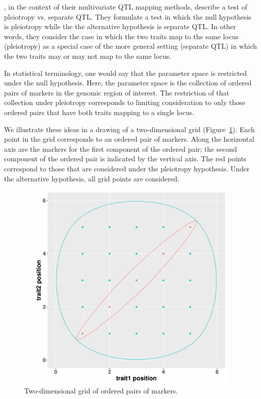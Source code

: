 \documentclass[]{article}\usepackage[]{graphicx}\usepackage[]{color}
\newenvironment{knitrout}{}{} %
\begin{document}
\citet{jiang1995multiple}, in the context of their multivariate QTL mapping methods, 
describe a test of pleiotropy vs. separate QTL. 
They formulate a test in which the null hypothesis
is pleiotropy while the the alternative hypothesis is separate QTL.
In other words, they consider the case in which the two traits map to the same locus
(pleiotropy) as a special case of the more general setting (separate QTL)
in which the two traits may or may not map to the same locus.

In statistical terminology, one would say that the parameter space is restricted under the null hypothesis. Here, the parameter space is the collection of ordered pairs of markers in the genomic region of interest. The restriction of that collection under pleiotropy corresponds to limiting consideration to only those ordered pairs that have both traits mapping to a single locus. 

We illustrate these ideas in a drawing of a two-dimensional grid (Figure~\ref{fig:encircle}). Each point in the grid corresponds to an ordered pair of markers. Along the horizontal axis are the markers for the first component of the ordered pair; the second component of the ordered pair is indicated by the vertical axis. The red points correspond to those that are considered under the pleiotropy hypothesis. Under the alternative hypothesis, all grid points are considered. 




\begin{knitrout}
\color{fgcolor}\begin{figure}
\includegraphics[width=6in,height=4in]{figure/encircle-1} \caption[Two-dimensional grid of ordered pairs of markers]{Two-dimensional grid of ordered pairs of markers.}\label{fig:encircle}
\end{figure}


\end{knitrout}
\end{document}
